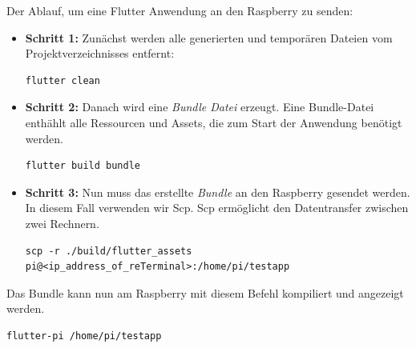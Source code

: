 \newpage

Der Ablauf, um eine Flutter Anwendung an den Raspberry zu senden:

\begin{itemize}
\item {\textbf{Schritt 1:}} Zunächst werden alle generierten und temporären Dateien vom Projektverzeichnisses entfernt:
\begin{lstlisting}[style=flutterListingStyle,caption=Flutter clean]
flutter clean
\end{lstlisting}

\item {\textbf{Schritt 2:}} Danach wird eine {\textit{Bundle Datei}} erzeugt. Eine Bundle-Datei enth\"ahlt alle Ressourcen und Assets, die zum Start der Anwendung benötigt werden.
\begin{lstlisting}[style=flutterListingStyle,caption= Bundle erstellen]
flutter build bundle
\end{lstlisting}

\item {\textbf{Schritt 3:}} Nun muss das erstellte \textit{Bundle} an den Raspberry gesendet werden. In diesem Fall verwenden wir Scp. Scp ermöglicht den Datentransfer zwischen zwei Rechnern.
\begin{lstlisting}[style=flutterListingStyle,caption=Senden der Datei]
scp -r ./build/flutter_assets pi@<ip_address_of_reTerminal>:/home/pi/testapp
\end{lstlisting}
\end{itemize}

\vspace{0.5cm}
Das Bundle kann nun am Raspberry mit diesem Befehl kompiliert und angezeigt werden.
\begin{lstlisting}[style=flutterListingStyle]
flutter-pi /home/pi/testapp
\end{lstlisting}